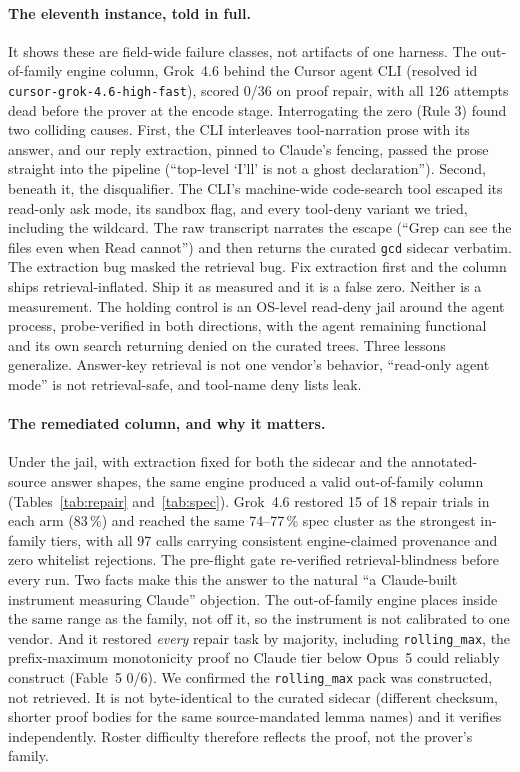 \documentclass{article}
\newcommand{\egrok}{Grok~4.6}
\begin{document}
\paragraph{The eleventh instance, told in full.} It shows these are
field-wide failure classes, not artifacts of one harness. The
out-of-family engine column, Grok~4.6 behind the Cursor agent CLI
(resolved id \texttt{cursor-grok-4.6-high-fast}), scored 0/36 on proof
repair, with all 126 attempts dead before the prover at the encode
stage. Interrogating the zero (Rule 3) found two colliding causes. First, the CLI interleaves tool-narration prose
with its answer, and our reply extraction, pinned to Claude's fencing,
passed the prose straight into the pipeline (``top-level `I'll' is not a
ghost declaration''). Second, beneath it, the disqualifier. The CLI's
machine-wide code-search tool escaped its read-only ask mode, its sandbox
flag, and every tool-deny variant we tried, including the wildcard. The
raw transcript narrates the escape (``Grep can see the files even when
Read cannot'') and then returns the curated \texttt{gcd} sidecar
verbatim. The extraction bug masked the retrieval bug. Fix extraction
first and the column ships retrieval-inflated. Ship it as measured and it
is a false zero. Neither is a measurement. The holding control is an
OS-level read-deny jail around the agent process, probe-verified in both
directions, with the agent remaining functional and its own search
returning denied on the curated trees. Three lessons generalize.
Answer-key retrieval is not one vendor's behavior, ``read-only agent
mode'' is not retrieval-safe, and tool-name deny lists leak.

\paragraph{The remediated column, and why it matters.} Under the jail,
with extraction fixed for both the sidecar and the annotated-source
answer shapes, the same engine produced a valid out-of-family column
(Tables~\ref{tab:repair} and~\ref{tab:spec}). \egrok{} restored 15 of 18
repair trials in each arm (83\,\%) and reached the same 74--77\,\% spec
cluster as the strongest in-family tiers, with all 97 calls carrying
consistent engine-claimed provenance and zero whitelist rejections. The
pre-flight gate re-verified retrieval-blindness before every run. Two
facts make this the answer to the natural ``a Claude-built instrument
measuring Claude'' objection. The out-of-family engine places inside the
same range as the family, not off it, so the instrument is not calibrated
to one vendor. And it restored \emph{every} repair task by majority,
including \texttt{rolling\_max}, the prefix-maximum monotonicity proof no
Claude tier below Opus~5 could reliably construct (Fable~5 0/6). We
confirmed the \texttt{rolling\_max} pack was constructed, not retrieved.
It is not byte-identical to the curated sidecar (different checksum,
shorter proof bodies for the same source-mandated lemma names) and it
verifies independently. Roster difficulty therefore reflects the proof,
not the prover's family.
\end{document}
